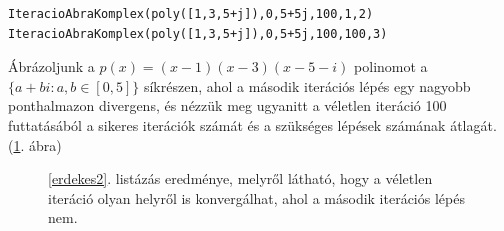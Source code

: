 \documentclass[a4paper,12pt]{report}
\begin{document}
                \begin{singlespace}
                \begin{lstlisting}[caption=Bemenet,label=erdekes2]
IteracioAbraKomplex(poly([1,3,5+j]),0,5+5j,100,1,2)
IteracioAbraKomplex(poly([1,3,5+j]),0,5+5j,100,100,3)
				\end{lstlisting}
                \end{singlespace}
                Ábrázoljunk a $p(x)=(x-1)(x-3)(x-5-i)$ polinomot a $\{a+bi : a,b\in [0,5]\}$ síkrészen, ahol a második iterációs lépés egy nagyobb ponthalmazon divergens, és nézzük meg ugyanitt a véletlen iteráció 100 futtatásából a sikeres iterációk számát és a szükséges lépések számának átlagát. (\ref{atcsuszokep}. ábra)
                			\begin{figure}[h]
					\centering
			        \caption{\ref{erdekes2}. listázás eredménye, melyről látható, hogy a véletlen iteráció olyan helyről is konvergálhat, ahol a második iterációs lépés nem.}\label{atcsuszokep}
				\end{figure}












\end{document}
